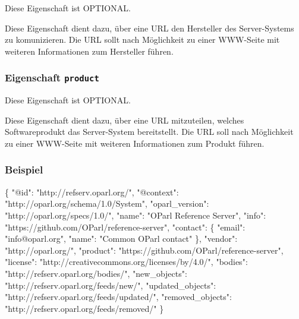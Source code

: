 \documentclass[,a4paper]{article}
\newenvironment{Shaded}{}{}
\newcommand{\DataTypeTok}[1]{\textcolor[rgb]{0.56,0.13,0.00}{{#1}}}
\newcommand{\StringTok}[1]{\textcolor[rgb]{0.25,0.44,0.63}{{#1}}}
\newcommand{\NormalTok}[1]{{#1}}
\begin{document}
Diese Eigenschaft ist OPTIONAL.

Diese Eigenschaft dient dazu, über eine URL den Hersteller des
Server-Systems zu komunizieren. Die URL sollt nach Möglichkeit zu einer
WWW-Seite mit weiteren Informationen zum Hersteller führen.

\subsubsection{Eigenschaft \texttt{product}}

Diese Eigenschaft ist OPTIONAL.

Diese Eigenschaft dient dazu, über eine URL mitzuteilen, welches
Softwareprodukt das Server-System bereitstellt. Die URL soll nach
Möglichkeit zu einer WWW-Seite mit weiteren Informationen zum Produkt
führen.

\subsubsection{Beispiel}

\begin{Shaded}
\begin{Highlighting}[]
\NormalTok{\{}
    \DataTypeTok{"@id"}\NormalTok{: }\StringTok{"http://refserv.oparl.org/"}\NormalTok{,}
    \DataTypeTok{"@context"}\NormalTok{: }\StringTok{"http://oparl.org/schema/1.0/System"}\NormalTok{,}
    \DataTypeTok{"oparl_version"}\NormalTok{: }\StringTok{"http://oparl.org/specs/1.0/"}\NormalTok{,}
    \DataTypeTok{"name"}\NormalTok{: }\StringTok{"OParl Reference Server"}\NormalTok{,}
    \DataTypeTok{"info"}\NormalTok{: }\StringTok{"https://github.com/OParl/reference-server"}\NormalTok{,}
    \DataTypeTok{"contact"}\NormalTok{: \{}
        \DataTypeTok{"email"}\NormalTok{: }\StringTok{"info@oparl.org"}\NormalTok{,}
        \DataTypeTok{"name"}\NormalTok{: }\StringTok{"Common OParl contact"}
    \NormalTok{\}, }
    \DataTypeTok{"vendor"}\NormalTok{: }\StringTok{"http://oparl.org/"}\NormalTok{,}
    \DataTypeTok{"product"}\NormalTok{: }\StringTok{"https://github.com/OParl/reference-server"}\NormalTok{,}
    \DataTypeTok{"license"}\NormalTok{: }\StringTok{"http://creativecommons.org/licenses/by/4.0/"}\NormalTok{,}
    \DataTypeTok{"bodies"}\NormalTok{: }\StringTok{"http://refserv.oparl.org/bodies/"}\NormalTok{,}
    \DataTypeTok{"new_objects"}\NormalTok{: }\StringTok{"http://refserv.oparl.org/feeds/new/"}\NormalTok{,}
    \DataTypeTok{"updated_objects"}\NormalTok{: }\StringTok{"http://refserv.oparl.org/feeds/updated/"}\NormalTok{,}
    \DataTypeTok{"removed_objects"}\NormalTok{: }\StringTok{"http://refserv.oparl.org/feeds/removed/"}
\NormalTok{\}}
\end{Highlighting}
\end{Shaded}
\end{document}
